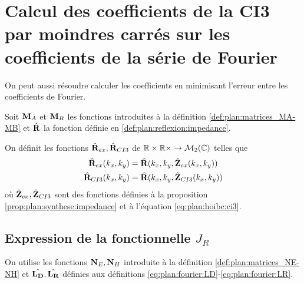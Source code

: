 \section{Calcul des coefficients de la CI3 par moindres carrés sur les coefficients de la série de Fourier}

  On peut aussi résoudre calculer les coefficients en minimisant l'erreur entre les coefficients de Fourier.

  Soit \(\mathbf{M}_A\) et \(\mathbf{M}_B\) les fonctions introduites à la définition \ref{def:plan:matrices_MA-MB} et \(\hat{\mathbf{R}}\) la fonction définie en \ref{def:plan:reflexion:impedance}.

  \begin{defn}%
    \label{def:plan:minimisation:matrices_MR}
    On définit les fonctions \(\hat{\mathbf{R}}_{ex}, \hat{\mathbf{R}}_{CI3}\) de \(\mathbb R\times\mathbb R\times \rightarrow \mathcal{M}_2(\mathbb C)\) telles que
    \begin{align*}
      \hat{\mathbf{R}}_{ex}(k_x,k_y) &= \hat{\mathbf{R}}(k_x,k_y, \hat{\mathbf{Z}}_{ex}(k_x,k_y))
      \\
      \hat{\mathbf{R}}_{CI3}(k_x,k_y) &= \hat{\mathbf{R}}(k_x,k_y, \hat{\mathbf{Z}}_{CI3}(k_x,k_y))
    \end{align*}
    où \(\hat{\mathbf{Z}}_{ex},\hat{\mathbf{Z}}_{CI3}\) sont des fonctions définies à la proposition \ref{prop:plan:synthese:impedance} et à l'équation \eqref{eq:plan:hoibc:ci3}.
  \end{defn}

  \subsection[Expression de la fonctionnelle JR]{Expression de la fonctionnelle \(J_R\)}

    On utilise les fonctions \(\mathbf{N}_E, \mathbf{N}_H\) introduite à la définition \ref{def:plan:matrices_NE-NH} et \(\hat{\mathbf{L_D}},\hat{\mathbf{L_R}}\) définies aux définitions \ref{eq:plan:fourier:LD}-\ref{eq:plan:fourier:LR}.

